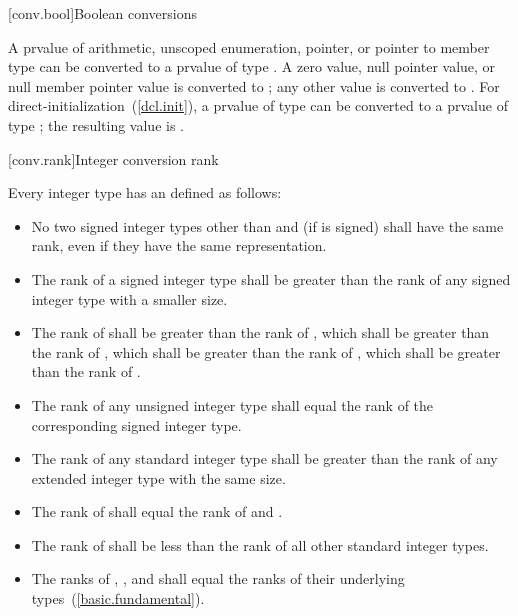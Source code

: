 [conv.bool]{Boolean conversions}

\pnum
{}%
A prvalue of arithmetic, unscoped enumeration, pointer, or pointer to member
type can be converted to a prvalue of type . A zero value, null
pointer value, or null member pointer value is converted to ; any
other value is converted to . For
direct-initialization~(\ref{dcl.init}), a prvalue of type
 can be converted to a prvalue of type
; the resulting value is .

[conv.rank]{Integer conversion rank}%

\pnum
Every integer type has an  defined as follows:

\begin{itemize}
\item No two signed integer types other than  and  (if  is signed) shall have the same rank, even if they have
the same representation.

\item The rank of a signed integer type shall be greater than the rank
of any signed integer type with a smaller size.

\item The rank of    shall be greater
than the rank of  , which shall be greater than
the rank of , which shall be greater than the rank of
 , which shall be greater than the rank of
 .

\item The rank of any unsigned integer type shall equal the rank of the
corresponding signed integer type.

\item The rank of any standard integer type shall be greater than the
rank of any extended integer type with the same size.

\item The rank of  shall equal the rank of 
 and  .

\item The rank of  shall be less than the rank of all other
standard integer types.

\item The ranks of , , and
 shall equal the ranks of their underlying
types~(\ref{basic.fundamental}).


\end{itemize}
